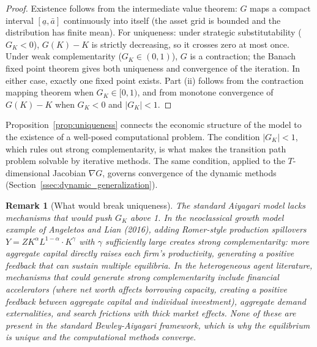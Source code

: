 \documentclass[12pt]{article}
\newtheorem{remark}{Remark}
\begin{document}
\begin{proof}
Existence follows from the intermediate value theorem: $G$ maps a compact interval $[\underline{a}, \bar{a}]$ continuously into itself (the asset grid is bounded and the distribution has finite mean). For uniqueness: under strategic substitutability ($G_K < 0$), $G(K) - K$ is strictly decreasing, so it crosses zero at most once. Under weak complementarity ($G_K \in (0,1)$), $G$ is a contraction; the Banach fixed point theorem gives both uniqueness and convergence of the iteration. In either case, exactly one fixed point exists. Part (ii) follows from the contraction mapping theorem when $G_K \in [0,1)$, and from monotone convergence of $G(K) - K$ when $G_K < 0$ and $|G_K| < 1$.
\end{proof}

\noindent Proposition~\ref{prop:uniqueness} connects the economic structure of the model to the existence of a well-posed computational problem. The condition $|G_K| < 1$, which rules out strong complementarity, is what makes the transition path problem solvable by iterative methods. The same condition, applied to the $T$-dimensional Jacobian $\nabla G$, governs convergence of the dynamic methods (Section~\ref{ssec:dynamic_generalization}).

\begin{remark}[What would break uniqueness]
\label{rem:break_uniqueness}
The standard Aiyagari model lacks mechanisms that would push $G_K$ above 1. In the neoclassical growth model example of Angeletos and Lian (2016), adding Romer-style production spillovers $Y = Z K^\alpha L^{1-\alpha} \cdot K^\gamma$ with $\gamma$ sufficiently large creates strong complementarity: more aggregate capital directly raises each firm's productivity, generating a positive feedback that can sustain multiple equilibria. In the heterogeneous agent literature, mechanisms that could generate strong complementarity include financial accelerators (where net worth affects borrowing capacity, creating a positive feedback between aggregate capital and individual investment), aggregate demand externalities, and search frictions with thick market effects. None of these are present in the standard Bewley-Aiyagari framework, which is why the equilibrium is unique and the computational methods converge.
\end{remark}
\end{document}
